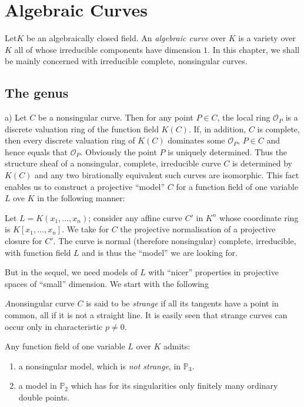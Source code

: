 \chapter{Algebraic Curves}\label{chap2} %

Let\pageoriginale $K$ be an algebraically closed field. An
\textit{algebraic curve} 
over $K$ is a variety over $K$ all of whose irreducible components
have dimension $1$. In this chapter, we shall be mainly concerned with
irreducible complete, nonsingular curves. 

\section{The genus}\label{chap2:sec1}%

a) Let $C$ be a nonsingular curve. Then for any point $P \in C$, the
local ring $\mathscr{O}_{P}$ is a discrete valuation ring of the
function field $K(C)$. If, in addition, $C$ is complete, then every
discrete valuation ring of $K(C)$ dominates some $\mathscr{O}_P$,
$P\in C$ and hence equals that $\mathscr{O}_P$. Obviously the point
$P$ is uniquely determined. Thus the structure sheaf of a nonsingular,
complete, irreducible curve $C$ is determined by $K(C)$ and
any two birationally equivalent such curves are isomorphic. This fact
enables us to construct a projective ``model'' $C$ for a function field
of one variable $L$ ove $K$ in the following manner: 

Let $L = K(x_1,\ldots,x_n)$; consider any affine curve $C'$ in $K^{n}$
whose coordinate ring is $K[x_1,\ldots,x_n]$. We take for $C$ the
projective normalisation of a projective closure for $C'$. The curve
is normal (therefore nonsingular) complete, irreducible, with function
field $L$ and is thus the ``model'' we are looking for. 

But in the sequel, we need models of $L$ with ``nicer'' properties in
projective spaces of ``small'' dimension. We start with the following 

\begin{defi*}%
  $A$\pageoriginale nonsingular curve $C$ is said to be {\em strange} if all its
  tangents have a point in common, all if it is not a straight line. It is
  easily seen that strange curves can occur only in characteristic
  $p\neq 0$. 
\end{defi*}

\setcounter{theorem}{0}
\begin{theorem}\label{chap2:sec1:thm1}%
  Any function field of one variable $L$ over $K$ admits:
  \begin{enumerate}[\rm i)]
  \item a nonsingular model, which is {\em not strange}, in $\mathbb{P}_3$.
  \item a model in $\mathbb{P}_2$ which has for its singularities only
    finitely many ordinary double points. 
  \end{enumerate}
\end{theorem}


